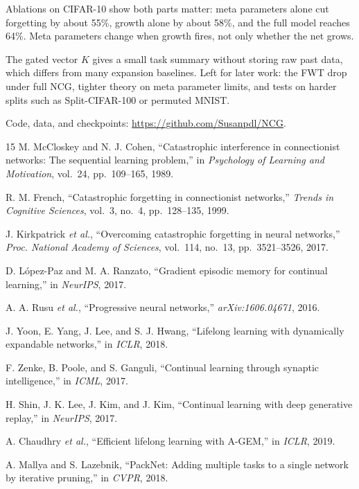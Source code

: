 \documentclass[conference]{IEEEtran}
\begin{document}
Ablations on CIFAR-10 show both parts matter: meta parameters alone cut forgetting by about 55\%, growth alone by about 58\%, and the full model reaches 64\%. Meta parameters change when growth fires, not only whether the net grows.

The gated vector $K$ gives a small task summary without storing raw past data, which differs from many expansion baselines. Left for later work: the FWT drop under full NCG, tighter theory on meta parameter limits, and tests on harder splits such as Split-CIFAR-100 or permuted MNIST.

Code, data, and checkpoints: \url{https://github.com/Susanpdl/NCG}.

\begin{thebibliography}{15}
 M. McCloskey and N. J. Cohen, ``Catastrophic interference in connectionist networks: The sequential learning problem,'' in \textit{Psychology of Learning and Motivation}, vol.~24, pp.~109--165, 1989.

 R. M. French, ``Catastrophic forgetting in connectionist networks,'' \textit{Trends in Cognitive Sciences}, vol.~3, no.~4, pp.~128--135, 1999.

 J. Kirkpatrick \textit{et al.}, ``Overcoming catastrophic forgetting in neural networks,'' \textit{Proc. National Academy of Sciences}, vol.~114, no.~13, pp.~3521--3526, 2017.

 D. L\'opez-Paz and M. A. Ranzato, ``Gradient episodic memory for continual learning,'' in \textit{NeurIPS}, 2017.

 A. A. Rusu \textit{et al.}, ``Progressive neural networks,'' \textit{arXiv:1606.04671}, 2016.

 J. Yoon, E. Yang, J. Lee, and S. J. Hwang, ``Lifelong learning with dynamically expandable networks,'' in \textit{ICLR}, 2018.

 F. Zenke, B. Poole, and S. Ganguli, ``Continual learning through synaptic intelligence,'' in \textit{ICML}, 2017.

 H. Shin, J. K. Lee, J. Kim, and J. Kim, ``Continual learning with deep generative replay,'' in \textit{NeurIPS}, 2017.

 A. Chaudhry \textit{et al.}, ``Efficient lifelong learning with A-GEM,'' in \textit{ICLR}, 2019.

 A. Mallya and S. Lazebnik, ``PackNet: Adding multiple tasks to a single network by iterative pruning,'' in \textit{CVPR}, 2018.


\end{thebibliography}
\end{document}
